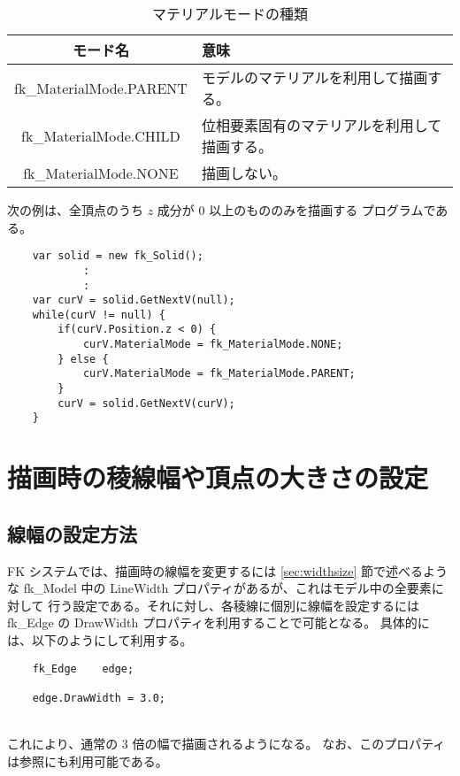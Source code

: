 \begin{table}[H]
\caption{マテリアルモードの種類}
\label{tbl:mate1}
\begin{center}
\begin{tabular}{|c|l|}
\hline
モード名 & 意味 \\ \hline \hline
fk\_MaterialMode.PARENT & モデルのマテリアルを利用して描画する。\\ \hline
fk\_MaterialMode.CHILD & 位相要素固有のマテリアルを利用して描画する。\\ \hline
fk\_MaterialMode.NONE & 描画しない。\\ \hline
\end{tabular}
\end{center}
\end{table}
次の例は、全頂点のうち \(z\) 成分が 0 以上のもののみを描画する
プログラムである。
\\
\begin{breakbox}
\begin{verbatim}
    var solid = new fk_Solid();
            :
            :
    var curV = solid.GetNextV(null);
    while(curV != null) {
        if(curV.Position.z < 0) {
            curV.MaterialMode = fk_MaterialMode.NONE;
        } else {
            curV.MaterialMode = fk_MaterialMode.PARENT;
        }
        curV = solid.GetNextV(curV);
    }
\end{verbatim}
\end{breakbox}
\section{描画時の稜線幅や頂点の大きさの設定}
\subsection{線幅の設定方法}
FK システムでは、描画時の線幅を変更するには
\ref{sec:widthsize} 節で述べるような fk\_Model 中の
LineWidth プロパティがあるが、これはモデル中の全要素に対して
行う設定である。それに対し、各稜線に個別に線幅を設定するには
fk\_Edge の DrawWidth プロパティを利用することで可能となる。
具体的には、以下のようにして利用する。
\\
\begin{screen}
\begin{verbatim}
    fk_Edge    edge;

    edge.DrawWidth = 3.0;
\end{verbatim}
\end{screen}
~ \\
これにより、通常の 3 倍の幅で描画されるようになる。
なお、このプロパティは参照にも利用可能である。

